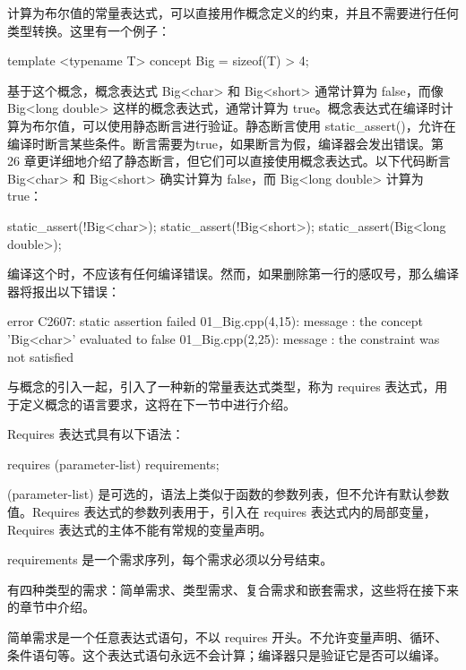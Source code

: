 计算为布尔值的常量表达式，可以直接用作概念定义的约束，并且不需要进行任何类型转换。这里有一个例子：

\begin{cpp}
template <typename T>
concept Big = sizeof(T) > 4;
\end{cpp}

基于这个概念，概念表达式 Big<char> 和 Big<short> 通常计算为 false，而像 Big<long double> 这样的概念表达式，通常计算为 true。概念表达式在编译时计算为布尔值，可以使用静态断言进行验证。静态断言使用 static\_assert()，允许在编译时断言某些条件。断言需要为true，如果断言为假，编译器会发出错误。第 26 章更详细地介绍了静态断言，但它们可以直接使用概念表达式。以下代码断言 Big<char> 和 Big<short> 确实计算为 false，而 Big<long double> 计算为 true：

\begin{cpp}
static_assert(!Big<char>);
static_assert(!Big<short>);
static_assert(Big<long double>);
\end{cpp}

编译这个时，不应该有任何编译错误。然而，如果删除第一行的感叹号，那么编译器将报出以下错误：

\begin{shell}
error C2607: static assertion failed
01_Big.cpp(4,15): message : the concept 'Big<char>' evaluated to false
01_Big.cpp(2,25): message : the constraint was not satisfied
\end{shell}

与概念的引入一起，引入了一种新的常量表达式类型，称为 requires 表达式，用于定义概念的语言要求，这将在下一节中进行介绍。


Requires 表达式具有以下语法：

\begin{cpp}
requires (parameter-list) { requirements; }
\end{cpp}

(parameter-list) 是可选的，语法上类似于函数的参数列表，但不允许有默认参数值。Requires 表达式的参数列表用于，引入在 requires 表达式内的局部变量，Requires 表达式的主体不能有常规的变量声明。

requirements 是一个需求序列，每个需求必须以分号结束。

有四种类型的需求：简单需求、类型需求、复合需求和嵌套需求，这些将在接下来的章节中介绍。


简单需求是一个任意表达式语句，不以 requires 开头。不允许变量声明、循环、条件语句等。这个表达式语句永远不会计算；编译器只是验证它是否可以编译。


